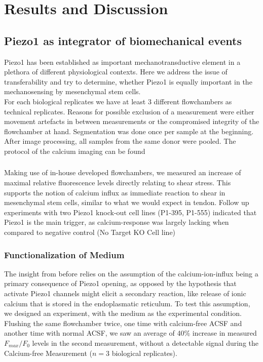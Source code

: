 \chapter{Results and Discussion}


\section{Piezo1 as integrator of biomechanical events}
Piezo1 has been established as important mechanotransductive element \cite{Murthy2017PiezosTU}  in a plethora of different physiological contexts. Here we address the issue of transferability and try to determine, whether Piezo1 is equally important in the mechanosensing by mesenchymal stem cells.\\
For each biological replicates we have at least 3 different flowchambers as technical replicates. Reasons for possible exclusion of a measurement were either movement artefacts in between measurements or the compromised integrity of the flowchamber at hand. Segmentation was done once per sample at the beginning. After image processing, all samples from the same donor were pooled. The protocol of the calcium imaging can be found \\

\subsection{}
Making use of in-house developed flowchambers, we measured an increase of maximal relative fluorescence levels directly relating to shear stress. This supports the notion of calcium influx as immediate reaction to shear in mesenchymal stem cells, similar to what we would expect in tendon. Follow up experiments with two Piezo1 knock-out cell lines (P1-395, P1-555) indicated that Piezo1 is the main trigger, as calcium-response was largely lacking when compared to negative control (No Target KO Cell line) \\ 




\subsection{Functionalization of Medium}
The insight from before relies on the assumption of the calcium-ion-influx being a primary consequence of Piezo1 opening, as opposed by the hypothesis that activate Piezo1 channels might elicit a secondary reaction, like release of ionic calcium that is stored in the endoplasmatic reticulum. To test this assumption, we designed an experiment, with the medium as the experimental condition.\\
Flushing the same flowchamber twice, one time with calcium-free ACSF and another time with normal ACSF, we saw an average of 40\% increase in measured $F_{max}/F_{0}$ levels in the second measurement, without a detectable signal during the Calcium-free Measurement ($n=3$ biological replicates).\par

